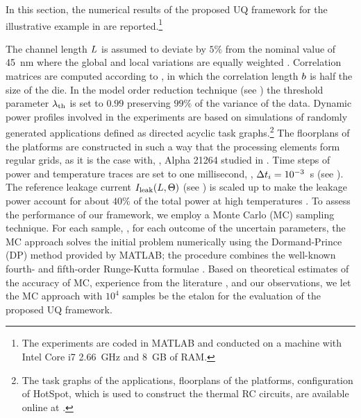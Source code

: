 In this section, the numerical results of the proposed UQ framework for the illustrative example in  are reported.\footnote{The experiments are coded in MATLAB \cite{matlab} and conducted on a machine with Intel Core i7 2.66~GHz and 8~GB of RAM.}

The channel length $L$ is assumed to deviate by $5\%$ from the nominal value of 45~nm where the global and local variations are equally weighted \cite{juan2011, juan2012}. Correlation matrices are computed according to , in which the correlation length $b$ is half the size of the die. In the model order reduction technique (see ) the threshold parameter $\lambda_\text{th}$ is set to $0.99$ preserving $99\%$ of the variance of the data. Dynamic power profiles involved in the experiments are based on simulations of randomly generated applications defined as directed acyclic task graphs.\footnote{The task graphs of the applications, floorplans of the platforms, configuration of HotSpot, which is used to construct the thermal RC circuits, are available online at \cite{sources}.} The floorplans of the platforms are constructed in such a way that the processing elements form regular grids, as it is the case with, \eg, Alpha 21264 studied in \cite{juan2011}. Time steps of power and temperature traces are set to one millisecond, \ie, $\Delta t_i = 10^{-3}$~s (see ). The reference leakage current $I_{\text{leak}}(L, \Theta)$ (see ) is scaled up to make the leakage power account for about $40\%$ of the total power at high temperatures \cite{liu2007}. To assess the performance of our framework, we employ a Monte Carlo (MC) sampling technique. For each sample, \ie, for each outcome of the uncertain parameters, the MC approach solves the initial problem numerically using the Dormand-Prince (DP) method provided by MATLAB; the procedure combines the well-known fourth- and fifth-order Runge-Kutta formulae \cite{press2007}. Based on theoretical estimates \cite{diaz-emparanza2002} of the accuracy of MC, experience from the literature \cite{xiu2010, eldred2009, maitre2010, shen2009}, and our observations, we let the MC approach with $10^4$ samples be the etalon for the evaluation of the proposed UQ framework.

